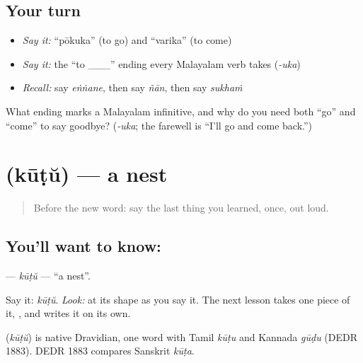 \subsection*{Your turn}
\begin{itemize}
\raggedright
  \item \emph{Say it:} \textquotedblleft{}pōkuka\textquotedblright{} (to go) and \textquotedblleft{}varika\textquotedblright{} (to come)
  \item \emph{Say it:} the \textquotedblleft{}to \_\_\_\textquotedblright{} ending every Malayalam verb takes (\emph{-uka})
  \item \emph{Recall:} say \emph{eṅṅane}, then say \emph{ñān}, then say \emph{sukhaṁ}
\end{itemize}

\begin{tcolorbox}[breakable,colback=teal!4,colframe=teal!35!black,title={Before you move on}]
What ending marks a Malayalam infinitive, and why do you need both \textquotedblleft{}go\textquotedblright{} and \textquotedblleft{}come\textquotedblright{} to say goodbye? (\emph{-uka}; the farewell is \textquotedblleft{}I'll go and come back.\textquotedblright{})
\end{tcolorbox}
\section[\texorpdfstring{\ml{കൂട്} (kūṭŭ)}{കൂട് (kūṭŭ)}]{ (kūṭŭ) — a nest}

\label{lesson:ML-C04-koodu}



\begin{quote}
Before the new word: say the last thing you learned, once, out loud.
\end{quote}

\subsection*{You'll want to know: }
\textbf{} — \emph{kūṭŭ} — \textquotedblleft{}a nest\textquotedblright{}.

Say it: \emph{kūṭŭ}. \emph{Look:} at its shape as you say it. The next lesson takes one piece of it, \textbf{}, and writes it on its own.

\begin{cousinweb}
\textbf{} (\emph{kūṭŭ}) is native Dravidian, one word with Tamil \emph{kūṭu} and Kannada \emph{gūḍu} (DEDR 1883). DEDR 1883 compares Sanskrit \emph{kūṭa}.
\end{cousinweb}

